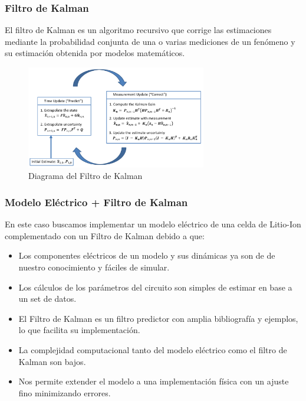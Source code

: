 \documentclass[10pt]{beamer}
\theoremstyle{remark}
\theoremstyle{definition}
\begin{document}
\begin{frame}[allowframebreaks]
  	\frametitle{Filtro de Kalman}
  	El filtro de Kalman es un algoritmo recursivo que corrige las estimaciones
  	mediante la probabilidad conjunta de una o varias mediciones de un fenómeno y
  	su estimación obtenida por modelos matemáticos.
  	\begin{figure}[h!]
		\centering
		\includegraphics[width=0.7\textwidth]{images/KalmanFilterDiagram.png}
		\caption{Diagrama del Filtro de Kalman}
		\label{fig:kf_sch}
  	\end{figure}
\end{frame}

\begin{frame}[allowframebreaks]
	\frametitle{Modelo Eléctrico + Filtro de Kalman}
  	En este caso buscamos implementar un modelo eléctrico de una celda de
  	Litio-Ion complementado con un Filtro de Kalman debido a que:
  	\begin{itemize}
		\item Los componentes eléctricos de un modelo y sus dinámicas ya son de
	  		de nuestro conocimiento y fáciles de simular.
		\item Los cálculos de los parámetros del circuito son simples de estimar en
	  		base a un set de datos.
		\item El Filtro de Kalman es un filtro predictor con amplia bibliografía y
	 	 	ejemplos, lo que facilita su implementación.
		\item La complejidad computacional tanto del modelo eléctrico como el filtro
	 		de Kalman son bajos.
		\item Nos permite extender el modelo a una implementación física con un
	  		ajuste fino minimizando errores.
  	\end{itemize}
\end{frame}
\end{document}
